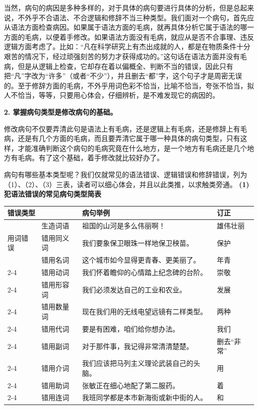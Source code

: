 当然，病句的病因是多种多样的，对于具体的病句要进行具体的分析，但是总起来说，不外乎不合语法、不合逻辑和修辞不当三种类型。我们面对一个病句，首先应从语法方面检查病因。如果属于语法方面的毛病，就再具体分析它属于语法的哪一方面的毛病，以便着手修改。如果语法方面没有毛病，就应从是否不合事理、违反逻辑方面考虑了。比如：“凡在科学研究上有杰出成就的人，都是在物质条件十分艰苦的情况下，经过顽强刻苦的努力才获得成功的。”这句话在语法方面并没有毛病，但是从逻辑上检查，它却存在着以偏概全、判断不当的错误，因此只有把“凡”字改为“许多”（或者“不少”），并且删去“都”字，这个句子才是周密无误的。至于修辞方面的毛病，不外乎用词色彩不恰当，比喻不恰当，夸张不恰当，拟人不恰当，等等，只要用心体会，仔细辨析，是不难发现它的病因的。

\textbf{2. 掌握病句类型是修改病句的基础。}

修改病句不仅要弄清此句是语法上有毛病，还是逻辑上有毛病，还是修辞上有毛病，还是有几个方面的毛病，而且要弄清它属于哪一种具体的病句类型，只有这样，才能准确判断这个病句的毛病究竟在什么地方，是一个地方有毛病还是几个地方有毛病。有了这个基础，着手修改就比较好办了。

病句有哪些基本类型呢？我们仅就常见的语法错误、逻辑错误和修辞错误，列为（1）、（2）、（3）三表，读者可以细心体会，并且以此类推，以求触类旁通。
\newpage
\textbf{(1) 犯语法错误的常见病句类型简表}

\noindent
\begin{tabular}{|lp{5em}|p{10em}|p{4em}|}
	\hline
	\multicolumn{2}{|l|}{错误类型} & 病句举例 & 订正\\ \hline
	\multicolumn{1}{|l|}{\multirow{3}{*}{用词错误}} & 生造词语  & 祖国的山河是多么伟丽啊！      & 雄伟壮丽 \\ \cline{2-4} 
	\multicolumn{1}{|l|}{} & 错用同义词 & 我们要象保卫眼珠一样地保卫秧苗。 & 保护\\ \cline{2-4} 
	\multicolumn{1}{|l|}{} & 错用名词 & 这个城市如今显得更青春、更美丽了。 & 年青\\ \cline{2-4}
	\multicolumn{1}{|l|}{} & 错用动词 & 我们怀着瞻仰的心情踏上纪念碑的台阶。 & 崇敬\\ \cline{2-4}
	\multicolumn{1}{|l|}{} & 错用形容词 & 我们必须发达自己的工业和农业。 & 发展\\ \cline{2-4}
	\multicolumn{1}{|l|}{} & 错用数量词 & 现在我们用的无线电望远镜有二样类型。 & 两种\\ \cline{2-4}
	\multicolumn{1}{|l|}{} & 错用代词 & 要是有困难，咱们给你想办法。 & 我们\\ \cline{2-4}
	\multicolumn{1}{|l|}{} & 错用副词 & 对于那件事，我记得非常清清楚楚。 & 删去“非常”\\ \cline{2-4}
	\multicolumn{1}{|l|}{} & 错用介词 & 我们应该把马列主义理论武装自己的头脑。 & 用\\ \cline{2-4}
	\multicolumn{1}{|l|}{} & 错用助词 & 张敏正在细心地配了第二服药。 & 着\\ \cline{2-4}
	\multicolumn{1}{|l|}{} & 错用连词 & 我班同学都是本市新海街或新中街的人。 & 和\\
	\hline
\end{tabular}

